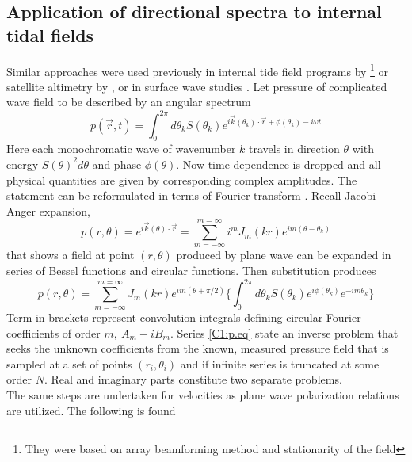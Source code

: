 \documentclass[12pt]{article}
\begin{document}
\subsection{Application of directional spectra to internal tidal fields}
\label{C3.app:ddec}
Similar approaches were used previously in internal tide field programs by 
\cite{hendry1977observations, lozovatsky2003spatial}\footnote{They were based on array 
beamforming method and stationarity of the field} or satellite altimetry by \cite{dushaw2002mapping}, 
or in surface wave studies \citep{longuet1961observations, munk1963directional, long1986inverse}. 
Let pressure of complicated wave field to be described by an angular spectrum
\begin{equation}
\label{C1:eq.spectrum}
p(\vec{r}, t) = \int_0^{2\pi}  d\theta_k S(\theta_k) e^{i \vec{k}(\theta_k) \cdot \vec{r} + 
	\phi(\theta_k) - i \omega t}
\end{equation}
Here each monochromatic wave of wavenumber $k$ travels in direction $\theta$ with 
energy $S(\theta)^2 d\theta$ and phase $\phi(\theta)$. Now time dependence is dropped and all 
physical quantities are given by corresponding complex amplitudes. The statement can be 
reformulated in terms of Fourier transform \citep{munk1963directional}. Recall Jacobi-Anger 
expansion,
\begin{equation}
p(r, \theta) = e^{i \vec{k}(\theta) \cdot \vec{r}} = \sum_{m = -\infty}^{m = \infty} i^{m} J_{m}(k 
r) e^{im(\theta - \theta_k)}
\end{equation}
that shows a field at point $(r, \theta)$ produced by plane wave can be expanded in series of 
Bessel functions and circular functions. Then substitution produces
\begin{equation}
\label{C1:p.eq}
p(r, \theta) = \sum_{m=-\infty}^{m=\infty} J_m(kr) e^{im(\theta + \pi/2)} \Big\{ \int_0^{2\pi}  
d\theta_k 
S(\theta_k) 
e^{i\phi(\theta_k)} e^{-im\theta_k} \Big\}
\end{equation}
Term in brackets represent convolution integrals defining circular Fourier coefficients of 
order $m,~A_m - i B_m$. Series \eqref{C1:p.eq} state an inverse problem that seeks the 
unknown coefficients from the known, measured pressure field that is sampled at a set of points 
$(r_i, \theta_i)$ and if infinite series is truncated at some order $N$. Real and imaginary parts 
constitute two separate problems.\\
The same steps are undertaken for velocities as plane wave polarization relations 
\citep[e.g.,][]{muller2000scattering} are utilized. The following is found
\end{document}
